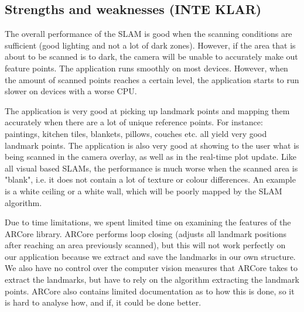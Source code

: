 \documentclass{article}
\begin{document}
\subsection{Strengths and weaknesses (INTE KLAR)}

The overall performance of the SLAM is good when the scanning conditions are sufficient (good lighting and not a lot of dark zones). However, if the area that is about to be scanned is to dark, the camera will be unable to accurately make out feature points. The application runs smoothly on most devices. However, when the amount of scanned points reaches a certain level, the application starts to run slower on devices with a worse CPU. 

The application is very good at picking up landmark points and mapping them accurately when there are a lot of unique reference points. For instance: paintings, kitchen tiles, blankets, pillows, couches etc. all yield very good landmark points. The application is also very good at showing to the user what is being scanned in the camera overlay, as well as in the real-time plot update. Like all visual based SLAMs, the performance is much worse when the scanned area is "blank", i.e. it does not contain a lot of texture or colour differences. An example is a white ceiling or a white wall, which will be poorly mapped by the SLAM algorithm.

Due to time limitations, we spent limited time on examining the features of the ARCore library. ARCore performs loop closing (adjusts all landmark positions after reaching an area previously scanned), but this will not work perfectly on our application because we extract and save the landmarks in our own structure. We also have no control over the computer vision measures that ARCore takes to extract the landmarks, but have to rely on the algorithm extracting the landmark points. ARCore also contains limited documentation as to how this is done, so it is hard to analyse how, and if, it could be done better.




\end{document}
